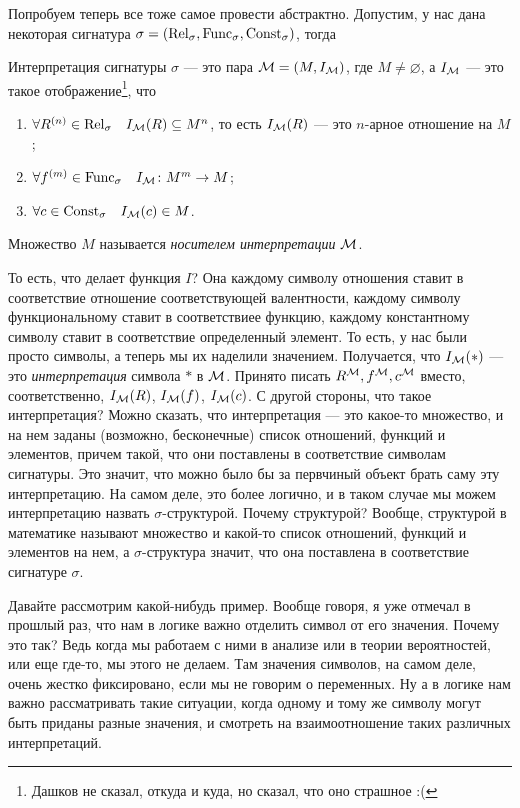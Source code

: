Попробуем теперь все тоже самое провести абстрактно.
Допустим, у нас дана некоторая сигнатура $\sigma = (\mathrm{Rel}_{\sigma}, \mathrm{Func}_{\sigma}, \mathrm{Const}_{\sigma})$, тогда
\begin{definition}
    Интерпретация сигнатуры $\sigma$ --- это пара $\mathcal{M} = (M, I_{\mathcal{M}})$, где $M \neq \varnothing$, а $I_{\mathcal{M}}$ --- это такое отображение\footnote{Дашков не сказал, откуда и куда, но сказал, что оно страшное :(}, что
    \begin{enumerate}
        \item $\forall R^{(n)} \in \mathrm{Rel}_{\sigma} \quad I_{\mathcal{M}}(R) \subseteq M^{n}$, то есть $I_{\mathcal{M}}(R)$ --- это $n$-арное отношение на $M$;
        \item $\forall f^{(m)} \in \mathrm{Func}_{\sigma} \quad I_{\mathcal{M}} \colon M^{m} \to M$;
        \item $\forall c \in \mathrm{Const}_{\sigma} \quad I_{\mathcal{M}}(c) \in M$.
    \end{enumerate}
    Множество $M$ называется {\it носителем интерпретации} $\mathcal{M}$.
\end{definition}
То есть, что делает функция $I$?
Она каждому символу отношения ставит в соответствие отношение соответствующей валентности, каждому символу функциональному ставит в соответствиее функцию, каждому константному символу ставит в соответствие определенный элемент.
То есть, у нас были просто символы, а теперь мы их наделили значением.
Получается, что $I_{\mathcal{M}}(*)$ --- это {\it интерпретация} символа $*$ в $\mathcal{M}$.
Принято писать $R^{\mathcal{M}}, f^{\mathcal{M}}, c^{\mathcal{M}}$ вместо, соответственно, $I_{\mathcal{M}}(R)$, $I_{\mathcal{M}}(f)$, $I_{\mathcal{M}}(c)$.
С другой стороны, что такое интерпретация?
Можно сказать, что интерпретация --- это какое-то множество, и на нем заданы (возможно, бесконечные) список отношений, функций и элементов, причем такой, что они поставлены в соответствие символам сигнатуры.
Это значит, что можно было бы за первчиный объект брать саму эту интерпретацию.
На самом деле, это более логично, и в таком случае мы можем интерпретацию назвать $\sigma$-структурой.
Почему структурой?
Вообще, структурой в математике называют множество и какой-то список отношений, функций и элементов на нем, а $\sigma$-структура значит, что она поставлена в соответствие сигнатуре $\sigma$.

Давайте рассмотрим какой-нибудь пример.
Вообще говоря, я уже отмечал в прошлый раз, что нам в логике важно отделить символ от его значения.
Почему это так?
Ведь когда мы работаем с ними в анализе или в теории вероятностей, или еще где-то, мы этого не делаем.
Там значения символов, на самом деле, очень жестко фиксировано, если мы не говорим о переменных.
Ну а в логике нам важно рассматривать такие ситуации, когда одному и тому же символу могут быть приданы разные значения, и смотреть на взаимоотношение таких различных интерпретаций.


